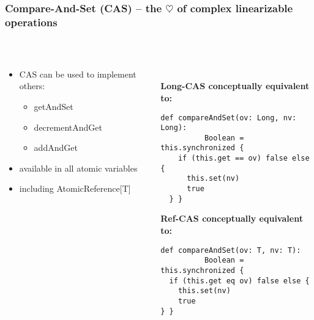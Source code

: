 \documentclass[aspectratio=169]{beamer}
\begin{document}
\begin{frame}[fragile]\frametitle{Compare-And-Set (CAS) -- the \alert{$\heartsuit$} of complex linearizable operations}
~\\[-8mm]
\begin{columns}
\begin{column}{0.48\textwidth}
\begin{itemize}
  \item CAS can be used to implement others:
    \begin{itemize}
      \item getAndSet
      \item decrementAndGet
      \item addAndGet
    \end{itemize}
  \item available in all atomic variables
  \item including AtomicReference[T]
\end{itemize}
\end{column}
\begin{column}{0.54\textwidth}
~\\
\textbf{Long-CAS conceptually equivalent to:}
\begin{lstlisting}[emph={execute,sleep,log,Long,synchronized}]
def compareAndSet(ov: Long, nv: Long):
          Boolean = this.synchronized {
    if (this.get == ov) false else {
      this.set(nv)
      true
  } }
\end{lstlisting}
\textbf{Ref-CAS conceptually equivalent to:}
\begin{lstlisting}[emph={execute,sleep,log,T,synchronized}]
def compareAndSet(ov: T, nv: T):
          Boolean = this.synchronized {
  if (this.get eq ov) false else {
    this.set(nv)
    true
} }
\end{lstlisting}
\end{column}
\end{columns}
\end{frame}
\end{document}
